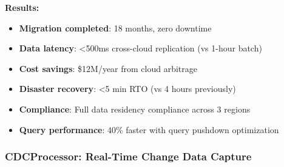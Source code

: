 \textbf{Results:}

\begin{itemize}
    \item \textbf{Migration completed}: 18 months, zero downtime
    \item \textbf{Data latency}: <500ms cross-cloud replication (vs 1-hour batch)
    \item \textbf{Cost savings}: \$12M/year from cloud arbitrage
    \item \textbf{Disaster recovery}: <5 min RTO (vs 4 hours previously)
    \item \textbf{Compliance}: Full data residency compliance across 3 regions
    \item \textbf{Query performance}: 40\% faster with query pushdown optimization
\end{itemize}

\subsubsection{CDCProcessor: Real-Time Change Data Capture}

